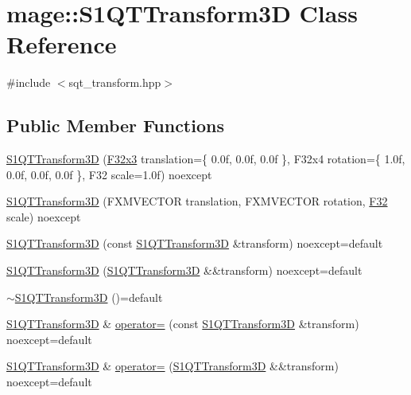 \hypertarget{classmage_1_1_s1_q_t_transform3_d}{}\section{mage\+:\+:S1\+Q\+T\+Transform3D Class Reference}
\label{classmage_1_1_s1_q_t_transform3_d}


{\ttfamily \#include $<$sqt\+\_\+transform.\+hpp$>$}

\subsection*{Public Member Functions}
\begin{DoxyCompactItemize}
\item 
\mbox{\hyperlink{classmage_1_1_s1_q_t_transform3_d_ad352fa570668d9daa7e910a0ccd52f92}{S1\+Q\+T\+Transform3D}} (\mbox{\hyperlink{namespacemage_a1e3c7a882af461f161caa1cbddaf1fa2}{F32x3}} translation=\{ 0.\+0f, 0.\+0f, 0.\+0f \}, F32x4 rotation=\{ 1.\+0f, 0.\+0f, 0.\+0f, 0.\+0f \}, F32 scale=1.\+0f) noexcept
\item 
\mbox{\hyperlink{classmage_1_1_s1_q_t_transform3_d_a9065c9e7ba841d8387e4cb7d9e46bdcc}{S1\+Q\+T\+Transform3D}} (F\+X\+M\+V\+E\+C\+T\+OR translation, F\+X\+M\+V\+E\+C\+T\+OR rotation, \mbox{\hyperlink{namespacemage_aa97e833b45f06d60a0a9c4fc22ae02c0}{F32}} scale) noexcept
\item 
\mbox{\hyperlink{classmage_1_1_s1_q_t_transform3_d_acf2cb9e7bc36b01f66c10df0407cc522}{S1\+Q\+T\+Transform3D}} (const \mbox{\hyperlink{classmage_1_1_s1_q_t_transform3_d}{S1\+Q\+T\+Transform3D}} \&transform) noexcept=default
\item 
\mbox{\hyperlink{classmage_1_1_s1_q_t_transform3_d_a050e4b5ebb924dadc24eea9a4a618fb2}{S1\+Q\+T\+Transform3D}} (\mbox{\hyperlink{classmage_1_1_s1_q_t_transform3_d}{S1\+Q\+T\+Transform3D}} \&\&transform) noexcept=default
\item 
\mbox{\hyperlink{classmage_1_1_s1_q_t_transform3_d_a382eb8d05d2f33f08268d310fed024de}{$\sim$\+S1\+Q\+T\+Transform3D}} ()=default
\item 
\mbox{\hyperlink{classmage_1_1_s1_q_t_transform3_d}{S1\+Q\+T\+Transform3D}} \& \mbox{\hyperlink{classmage_1_1_s1_q_t_transform3_d_ab401cfad943b7079595901546eb52d13}{operator=}} (const \mbox{\hyperlink{classmage_1_1_s1_q_t_transform3_d}{S1\+Q\+T\+Transform3D}} \&transform) noexcept=default
\item 
\mbox{\hyperlink{classmage_1_1_s1_q_t_transform3_d}{S1\+Q\+T\+Transform3D}} \& \mbox{\hyperlink{classmage_1_1_s1_q_t_transform3_d_af101855b85ae1ed6fb31da03134c965a}{operator=}} (\mbox{\hyperlink{classmage_1_1_s1_q_t_transform3_d}{S1\+Q\+T\+Transform3D}} \&\&transform) noexcept=default

\end{DoxyCompactItemize}
